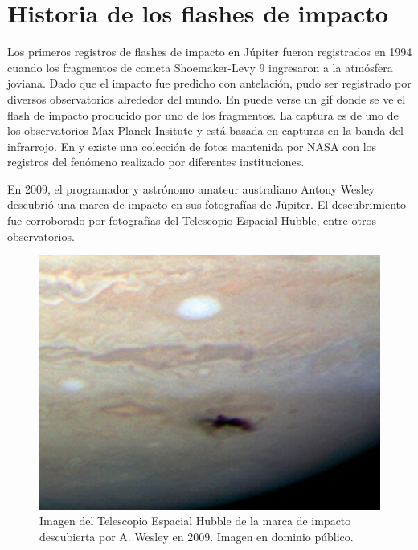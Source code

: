 \documentclass[a4paper,10pt]{article}
\begin{document}
\section{Historia de los flashes de impacto}
Los primeros registros de flashes de impacto en Júpiter fueron registrados en 1994 
cuando los fragmentos de cometa Shoemaker-Levy 9 ingresaron a la atmósfera joviana. Dado 
que el impacto fue predicho con antelación, pudo ser registrado por diversos 
observatorios alrededor del mundo. En \cite{7} puede verse un gif donde se ve el flash de 
impacto producido por uno de los fragmentos. La captura es de uno de los observatorios 
Max Planck Insitute y está basada en capturas en la banda del infrarrojo. En \cite{8} y 
\cite{9} existe una colección de fotos mantenida por NASA con los registros del fenómeno 
realizado por diferentes instituciones.

En 2009, el programador y astrónomo amateur australiano Antony Wesley descubrió una marca 
de impacto en sus fotografías de Júpiter\cite{10}. El descubrimiento fue corroborado por 
fotografías del Telescopio Espacial Hubble, entre otros observatorios.

\begin{figure}[H]
\centering
\includegraphics[scale=0.45]{Hs-2009-23-crop.jpg}
\caption{Imagen del Telescopio Espacial Hubble de la marca de impacto descubierta por A. 
Wesley en 2009. Imagen en dominio público.}
\label{amateur-map}
\end{figure}
\end{document}
